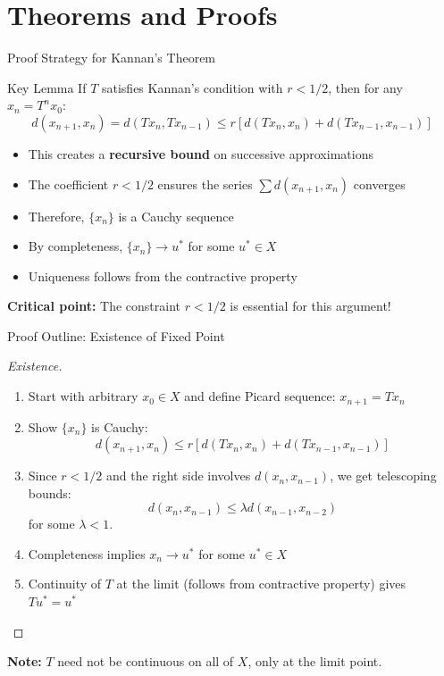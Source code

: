 \documentclass[aspectratio=169,10pt]{beamer}
\begin{document}
\section{Theorems and Proofs}

\begin{frame}{Proof Strategy for Kannan's Theorem}
    \begin{block}{Key Lemma}
        If $T$ satisfies Kannan's condition with $r < 1/2$, then for any $x_n = T^n x_0$:
        \[
            d(x_{n+1}, x_n) = d(Tx_n, Tx_{n-1}) \leq r[d(Tx_n, x_n) + d(Tx_{n-1}, x_{n-1})]
        \]
    \end{block}

    \vspace{0.2cm}
    \begin{itemize}
        \item This creates a \textbf{recursive bound} on successive approximations
        \item The coefficient $r < 1/2$ ensures the series $\sum d(x_{n+1}, x_n)$ converges
        \item Therefore, $\{x_n\}$ is a Cauchy sequence
        \item By completeness, $\{x_n\} \to u^*$ for some $u^* \in X$
        \item Uniqueness follows from the contractive property
    \end{itemize}

    \vspace{0.2cm}
    \textbf{Critical point:} The constraint $r < 1/2$ is essential for this argument!
\end{frame}

\begin{frame}{Proof Outline: Existence of Fixed Point}
    \begin{proof}[Existence]
        \begin{enumerate}
            \item Start with arbitrary $x_0 \in X$ and define Picard sequence: $x_{n+1} = Tx_n$

            \item Show $\{x_n\}$ is Cauchy:
            \[
                d(x_{n+1}, x_n) \leq r[d(Tx_n, x_n) + d(Tx_{n-1}, x_{n-1})]
            \]

            \item Since $r < 1/2$ and the right side involves $d(x_n, x_{n-1})$,
            we get telescoping bounds:
            \[
                d(x_n, x_{n-1}) \leq \lambda d(x_{n-1}, x_{n-2})
            \]
            for some $\lambda < 1$.

            \item Completeness implies $x_n \to u^*$ for some $u^* \in X$

            \item Continuity of $T$ at the limit (follows from contractive property) gives $Tu^* = u^*$
        \end{enumerate}
    \end{proof}

    \vspace{0.2cm}
    \textbf{Note:} $T$ need not be continuous on all of $X$, only at the limit point.
\end{frame}
\end{document}
